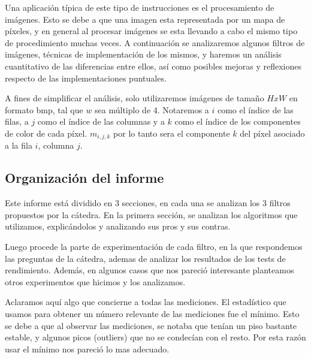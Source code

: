 Una aplicación típica de este tipo de instrucciones es el procesamiento de imágenes. Esto se debe a que una imagen esta representada por un mapa de píxeles, y en general al procesar imágenes se esta llevando a cabo el mismo tipo de procedimiento muchas veces. A continuación se analizaremos algunos filtros de imágenes, técnicas de implementación de los mismos, y haremos un análisis cuantitativo de las diferencias entre ellos, así como posibles mejoras y reflexiones respecto de las implementaciones puntuales.

A fines de simplificar el análisis, solo utilizaremos imágenes de tamaño $HxW$ en formato bmp, tal que $w$ sea múltiplo de 4. Notaremos a $i$ como el índice de las filas, a $j$ como el índice de las columnas y a $k$ como el índice de los componentes de color de cada píxel. $m_{i, j, k}$ por lo tanto sera el componente $k$ del píxel asociado a la fila $i$, columna $j$.


\subsection{Organización del informe}

Este informe está dividido en 3 secciones, en cada una se analizan los 3 filtros propuestos por la cátedra. En la primera sección, se analizan los algoritmos que utilizamos, explicándolos y analizando sus pros y sus contras. 

Luego procede la parte de experimentación de cada filtro, en la que respondemos las preguntas de la cátedra, ademas de analizar los resultados de los tests de rendimiento. Además, en algunos casos que nos pareció interesante planteamos otros experimentos que hicimos y los analizamos.


Aclaramos aquí algo que concierne a todas las mediciones. El estadístico que usamos para obtener un número relevante de las mediciones fue el mínimo. Esto se debe a que al observar las mediciones, se notaba que tenían un piso bastante estable, y algunos picos (outliers) que no se condecían con el resto.
Por esta razón usar el mínimo nos pareció lo mas adecuado.

